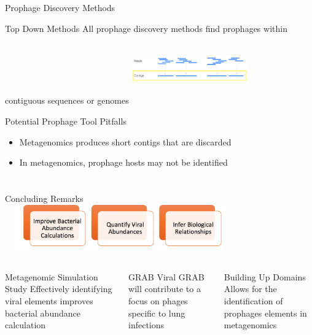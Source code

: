 \documentclass[11pt]{beamer}
\begin{document}
	\begin{frame}{Prophage Discovery Methods}
	\begin{block}{Top Down Methods}
	All prophage discovery methods find prophages within contiguous sequences or genomes
	\center
	\includegraphics[height=3cm, width=5cm]{box_contigs.png}
	\end{block}
	
	
	\begin{block}{Potential Prophage Tool Pitfalls}
	\begin{itemize}
	\item Metagenomics produces short contigs that are discarded
	\item In metagenomics, prophage hosts may not be identified 
	\end{itemize}
	\end{block}
	
	
	\end{frame}

	
	
	
\section{}

	\begin{frame}{Concluding Remarks}
	\center
	\includegraphics[height=2cm, width=10cm]{goals.png}
	\begin{columns}
	\begin{block}{Metagenomic Simulation Study}
	Effectively identifying viral elements improves bacterial abundance calculation
	\end{block}
	\begin{block}{GRAB}
	Viral GRAB will contribute to a focus on phages specific to lung infections
	\end{block}
	\begin{block}{Building Up Domains}
	Allows for the identification of prophages elements in metagenomics
	\end{block}
	
	\end{columns}
	
	\end{frame}
	
\end{document}
